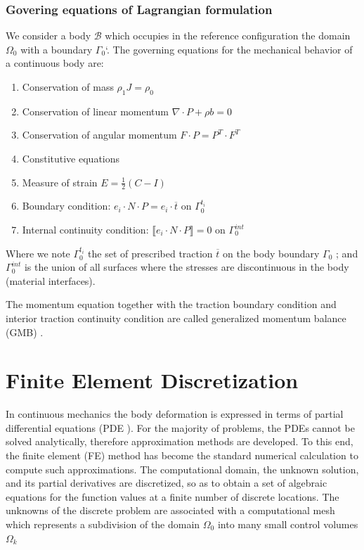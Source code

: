 \subsubsection*{Govering equations of Lagrangian formulation} 
We consider a body $\mathcal{B}$ which occupies in the reference configuration the domain $\Omega_0$ with a boundary $\Gamma_0$`. The governing equations for the mechanical behavior of a continuous body are:
\begin{enumerate}
\item Conservation of mass $\rho_1 J = \rho_0$
\item Conservation of linear momentum $\nabla \cdot P + \rho b = 0$
\item Conservation of angular momentum $F \cdot P = P^T \cdot F^T$
\item Constitutive equations
\item Measure of strain $E = \frac{1}{2} (C-I)$
\item Boundary condition: $e_i \cdot N \cdot P = e_i \cdot \overline{t}$ on $\Gamma_0^{t_i}$
\item Internal continuity condition: $\llbracket e_i \cdot N \cdot P \rrbracket = 0$ on $\Gamma_0^{int}$
\end{enumerate} 

Where we note $\Gamma_0^{t_i}$ the set of prescribed traction  $\overline{t}$ on the body boundary $\Gamma_0$ ; and $\Gamma_0^{int}$ is the union of all surfaces where the stresses are discontinuous in the body (material interfaces).

The momentum equation together with the traction boundary condition and interior traction continuity condition are called generalized momentum balance (GMB) .
\section{Finite Element Discretization}

\label{section:lagrangianmesh}
In continuous mechanics the body deformation is expressed in terms of partial differential equations (PDE ). For the majority of problems, the PDEs cannot be solved analytically, therefore approximation methods are developed. To this end, the finite element (FE) method has become the standard numerical calculation to compute such approximations. The computational domain, the unknown solution, and its partial derivatives are discretized, so as to obtain a set of algebraic equations for the function values at a finite number of discrete locations. The unknowns of the discrete problem are
associated with a computational mesh which represents a subdivision of the domain $\Omega_0$ into many small control volumes $\Omega_k$

